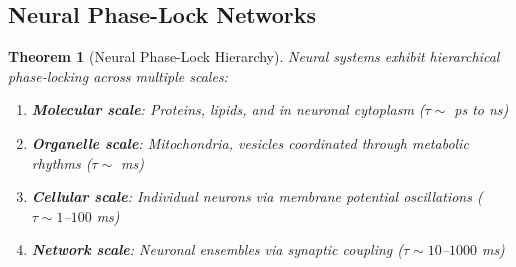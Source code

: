 \documentclass[11pt]{article}
\newtheorem{theorem}{Theorem}[section]
\theoremstyle{remark}
\begin{document}
\subsection{Neural Phase-Lock Networks}

\begin{theorem}[Neural Phase-Lock Hierarchy]
\label{thm:neural_phase_lock}
Neural systems exhibit hierarchical phase-locking across multiple scales:
\begin{enumerate}
\item \textbf{Molecular scale}: Proteins, lipids, and  in neuronal cytoplasm ($\tau \sim$ ps to ns)
\item \textbf{Organelle scale}: Mitochondria, vesicles coordinated through metabolic rhythms ($\tau \sim$ ms)
\item \textbf{Cellular scale}: Individual neurons via membrane potential oscillations ($\tau \sim 1$--$100$ ms)
\item \textbf{Network scale}: Neuronal ensembles via synaptic coupling ($\tau \sim 10$--$1000$ ms)
\end{enumerate}
\end{theorem}
\end{document}
